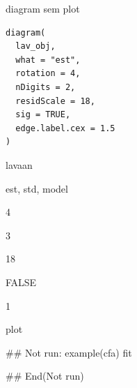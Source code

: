 \documentclass[a4paper]{book}
\begin{document}
%
\begin{Description}
diagram sem plot
\end{Description}
%
\begin{Usage}
\begin{verbatim}
diagram(
  lav_obj,
  what = "est",
  rotation = 4,
  nDigits = 2,
  residScale = 18,
  sig = TRUE,
  edge.label.cex = 1.5
)
\end{verbatim}
\end{Usage}
%
\begin{Arguments}
\begin{ldescription}
\item[\code{lav\_obj}] lavaan

\item[\code{what}] est, std, model

\item[\code{rotation}] 4

\item[\code{nDigits}] 3

\item[\code{residScale}] 18

\item[\code{sig}] FALSE

\item[\code{edge.label.cex}] 1
\end{ldescription}
\end{Arguments}
%
\begin{Value}
plot
\end{Value}
%
\begin{Examples}
\begin{ExampleCode}

\#\# Not run: 
example(cfa)
fit %


## End(Not run)

\end{ExampleCode}
\end{Examples}
\end{document}
